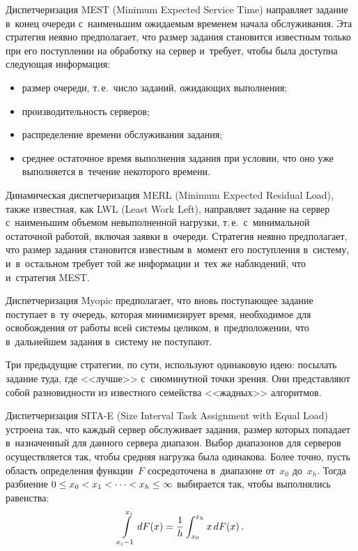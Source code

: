 \begin{multicols}{2}
    Диспетчеризация MEST (Minimum Expected Service Time) направляет задание в~конец 
очереди с~наименьшим ожидаемым временем начала обслуживания. Эта стратегия неявно 
предполагает, что размер задания становится известным только при его поступлении на 
обработку на сервер и~требует, чтобы была доступна следующая информация:
    \begin{itemize}
    \item размер очереди, т.\,е.\ число заданий, ожидающих выполнения;
    \item производительность серверов;
    \item распределение времени обслуживания задания;
    \item среднее остаточное время выполнения задания при условии, что оно уже 
выполняется в~течение некоторого времени.
    \end{itemize}
    
    Динамическая диспетчеризация MERL (Minimum Expected Residual Load), также 
известная, как LWL (Least Work Left), направляет задание на сервер с~наименьшим 
объемом невыполненной нагрузки, т.\,е.\ с~минимальной остаточной работой, включая 
заявки в~очереди. Стратегия неявно предполагает, что размер задания становится 
известным в~момент его поступления в~систему, и~в~остальном требует той же 
информации и~тех же наблюдений, что и~стратегия MEST.
    
    Диспетчеризация Myopic предполагает, что вновь поступающее задание поступает 
в~ту очередь, которая минимизирует время, необходимое для освобождения от работы 
всей системы целиком, в~предположении, что в~дальнейшем задания в~систему не 
поступают.
    
    Три предыдущие стратегии, по сути, используют одинаковую идею: посылать задание 
туда, где <<лучше>> с~сиюминутной точки зрения. Они представляют собой 
разновидности из известного семейства <<жадных>> алгоритмов.
    
    Диспетчеризация SITA-E (Size Interval Task Assignment with Equal Load) устроена так, 
что каждый сервер обслуживает задания, размер которых попадает в~назначенный для 
данного сервера диапазон. Выбор диапазонов для серверов осуществляется так, чтобы 
средняя нагрузка была одинакова. Более точно, пусть область определения функции~$F$ 
сосредоточена в~диапазоне от~$x_0$ до~$x_h$. Тогда разбиение $0\hm\leq x_0\hm< 
x_1<\cdots < x_h\hm\leq \infty$ выбирается так, чтобы выполнялись равенства: 
    $$
    \int\limits_{x_i-1}^{x_i} dF(x) =\displaystyle\frac{\displaystyle 1\mathstrut}{\displaystyle h\mathstrut} \int_{x_0}^{x_h} x\,dF(x)\,.
    $$
    

\end{multicols}
